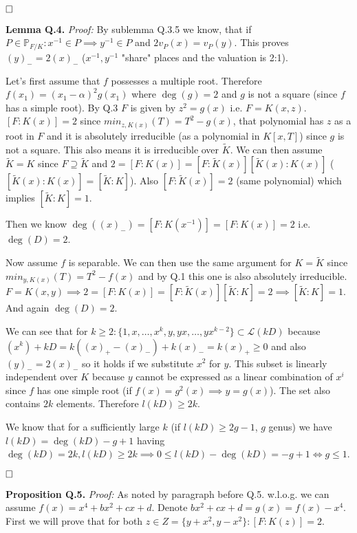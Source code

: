 \documentclass[12pt, a4paper]{article}
\newcommand{\qed}{\hfill\square}
\begin{document}
$\qed$

\textbf{Lemma Q.4.} \textit{Proof:}
By sublemma Q.3.5 we know, that if $P \in \mathbb{P}_{F/K}: x^{-1} \in P \implies y^{-1} \in P$ and $2v_P(x)=v_P(y)$. This proves $(y)_{-}=2(x)_{-}$ ($x^{-1},y^{-1}$ "share" places and the valuation is 2:1).

Let's first assume that $f$ possesses a multiple root. Therefore $f(x_1) = (x_1-\alpha)^2g(x_1)$ where $\deg(g) = 2$ and $g$ is not a square (since $f$ has a simple root). By Q.3 $F$ is given by $z^2 = g(x)$ i.e. $F=K(x,z)$. $[F:K(x)]=2$ since $min_{z,K(x)}(T) = T^2 - g(x)$, that polynomial has $z$ as a root in $F$ and it is absolutely irreducible (as a polynomial in $K[x,T]$) since $g$ is not a square. This also means it is irreducible over $\tilde{K}$. We can then assume $\tilde{K}=K$ since $F \supseteq \tilde{K}$ and $2 = [F:K(x)] = [F:\tilde{K}(x)] [\tilde{K}(x):K(x)]$ ($[\tilde{K}(x):K(x)]=[\tilde{K}:K]$). Also $[F:\tilde{K}(x)]=2$ (same polynomial) which implies $[\tilde{K}:K] = 1$.

Then we know $\deg((x)_{-}) = [F:K(x^{-1})] = [F:K(x)] = 2$ i.e. $\deg(D)=2$.

Now assume $f$ is separable. We can then use the same argument for $K=\tilde{K}$ since $min_{y,K(x)}(T) = T^2-f(x)$ and by Q.1 this one is also absolutely irreducible. $F=K(x,y) \implies 2=[F:K(x)] = [F:\tilde{K}(x)][\tilde{K}:K] = 2 \implies [\tilde{K}:K]=1$. And again $\deg(D)=2$.

We can see that for $k \geq 2: \{1,x,\dots,x^k, y, yx, \dots, yx^{k-2}\} \subset \mathcal{L}(kD)$ because $(x^k) + kD = k((x)_{+}-(x)_{-})+k(x)_{-} = k(x)_{+} \geq 0$ and also $(y)_{-}=2(x)_{-}$ so it holds if we substitute $x^2$ for $y$. This subset is linearly independent over $K$ because $y$ cannot be expressed as a linear combination of $x^i$ since $f$ has one simple root (if $f(x)=g^2(x) \implies y=g(x)$). The set also contains $2k$ elements. Therefore $l(kD) \geq 2k$. 

We know that for a sufficiently large $k$ (if $l(kD) \geq 2g-1$, $g$ genus) we have $l(kD) = \deg(kD)-g+1$ having $\deg(kD)=2k, l(kD) \geq 2k \implies 0 \leq l(kD)-\deg(kD) = -g + 1 \iff g \leq 1$.

$\qed$

\textbf{Proposition Q.5.} \textit{Proof:}
As noted by paragraph before Q.5. w.l.o.g. we can assume $f(x) = x^4+bx^2+cx+d$. Denote $bx^2+cx+d = g(x)=f(x)-x^4$. First we will prove that for both $z \in Z = \{y+x^2, y-x^2\}: [F:K(z)]=2$. 
\end{document}
